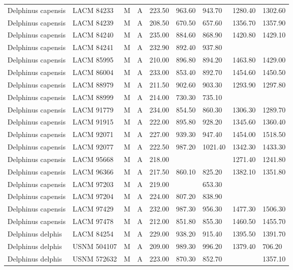 \begin{longtable}{|p{1in}p{.8in}p{.25in}p{.25in}p{.5in}p{.5in}p{.5in}p{.5in}p{.55in}|}
  Delphinus capensis & LACM 84233 & M & A & 223.50 & 963.60 & 943.70 & 1280.40 & 1302.60 \\ 
  Delphinus capensis & LACM 84239 & M & A & 208.50 & 670.50 & 657.60 & 1356.70 & 1357.90 \\ 
  Delphinus capensis & LACM 84240 & M & A & 235.00 & 884.60 & 868.90 & 1420.80 & 1429.10 \\ 
  Delphinus capensis & LACM 84241 & M & A & 232.90 & 892.40 & 937.80 &  &  \\ 
  Delphinus capensis & LACM 85995 & M & A & 210.00 & 896.80 & 894.20 & 1463.80 & 1429.00 \\ 
  Delphinus capensis & LACM 86004 & M & A & 233.00 & 853.40 & 892.70 & 1454.60 & 1450.50 \\ 
  Delphinus capensis & LACM 88979 & M & A & 211.50 & 902.60 & 903.30 & 1293.90 & 1297.80 \\ 
  Delphinus capensis & LACM 88999 & M & A & 214.00 & 730.30 & 735.10 &  &  \\ 
  Delphinus capensis & LACM 91779 & M & A & 234.00 & 854.50 & 860.30 & 1306.30 & 1289.70 \\ 
  Delphinus capensis & LACM 91915 & M & A & 222.00 & 895.80 & 928.20 & 1345.60 & 1360.40 \\ 
  Delphinus capensis & LACM 92071 & M & A & 227.00 & 939.30 & 947.40 & 1454.00 & 1518.50 \\ 
  Delphinus capensis & LACM 92077 & M & A & 222.50 & 987.20 & 1021.40 & 1342.30 & 1433.30 \\ 
  Delphinus capensis & LACM 95668 & M & A & 218.00 &  &  & 1271.40 & 1241.80 \\ 
  Delphinus capensis & LACM 96366 & M & A & 217.50 & 860.10 & 825.20 & 1382.10 & 1351.80 \\ 
  Delphinus capensis & LACM 97203 & M & A & 219.00 &  & 653.30 &  &  \\ 
  Delphinus capensis & LACM 97204 & M & A & 224.00 & 807.20 & 838.90 &  &  \\ 
  Delphinus capensis & LACM 97429 & M & A & 232.00 & 987.30 & 956.30 & 1477.30 & 1506.30 \\ 
  Delphinus capensis & LACM 97478 & M & A & 212.00 & 851.80 & 855.30 & 1460.50 & 1455.70 \\ 
  Delphinus delphis & LACM 84254 & M & A & 229.00 & 938.20 & 915.40 & 1395.50 & 1391.70 \\ 
  Delphinus delphis & USNM 504107 & M & A & 209.00 & 989.30 & 996.20 & 1379.40 & 706.20 \\ 
  Delphinus delphis & USNM 572632 & M & A & 223.00 & 870.30 & 852.70 &  & 1357.10 \\ 

\end{longtable}
